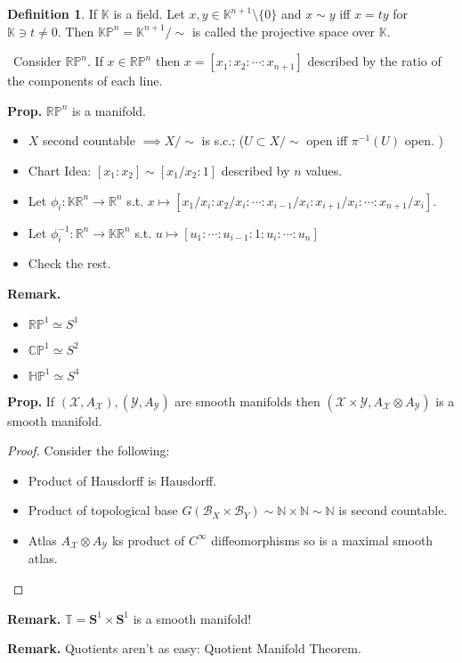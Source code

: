 \documentclass[11pt]{amsart}
\theoremstyle{definition}
\newtheorem{definition}{Definition}
\def\sphere{{\pmb S}}
\def\projspace{{ \mathbb{K}\mathbb{P} }}
\def\scriptb{{\mathcal B}}
\def\scriptx{{\mathcal X}}
\def\scripty{{\mathcal Y}}
\begin{document}
	\begin{definition}
		If $\mathbb{K}$ is a field. Let $x,y \in \mathbb{K}^{n+1} \setminus \{0\}$ and $x \sim y$ iff $x = ty$ for $\mathbb{K} \ni t \neq 0$. Then $\projspace^n = \mathbb{K}^{n+1}/\sim$ is called the projective space over $\mathbb{K}.$ 
	\end{definition}

	\ Consider $\mathbb{R}\mathbb{P}^n$. If $x \in \mathbb{R}\mathbb{P}^n$ then $x = [ x_1 : x_2 : \cdots : x_{n+1}]$ described by the ratio of the components of each line.

	\noindent \textbf{Prop.} $\mathbb{R}{\mathbb{P}}^n$ is a manifold.
	\begin{itemize}
		\item  $X$ second countable $\implies X /\sim$ is s.c.; ($U \subset X / \sim $ open iff $\pi^{-1}(U)$ open. )
		\item Chart Idea: $ [ x_1 : x_2 ] \sim  [ x_1/x_2 : 1]$ described by $n$ values.
		\item Let $\phi_i: \mathbb{K}\mathbb{R}^{n} \to \mathbb{R}^n$  s.t. $x \mapsto  [ x_1/x_i : x_2/x_i : \cdots : x_{i-1}/{x_i} : x_{i+1}/{x_i} : \cdots : x_{n+1}/x_i]$.
		\item Let $\phi_i^{-1}: \mathbb{R}^n \to \mathbb{K}\mathbb{R}^{n}$ s.t. $u \mapsto [u_1 : \cdots : u_{i-1} : 1 : u_i : \cdots : u_n] $
		\item Check the rest.
	\end{itemize}



	\noindent\textbf{Remark.}
	\begin{itemize}
		\item $\mathbb{R}\mathbb{P}^1 \simeq S^1$
		\item $\mathbb{C}\mathbb{P}^1 \simeq S^2$
		\item $\mathbb{H}\mathbb{P}^1 \simeq S^4$
	\end{itemize}


	\noindent \textbf{Prop.} If $(\scriptx, A_\scriptx),(\scripty, A_\scripty)$ are smooth manifolds then $(\scriptx \times \scripty, A_\scriptx \otimes A_\scripty)$ is a smooth manifold.
	\begin{proof}
	Consider the following:
		\begin{itemize}
			\item Product of Hausdorff is Hausdorff.
			\item Product of topological base $G(\scriptb_X \times \scriptb_Y) \sim  \mathbb{N} \times \mathbb{N} \sim \mathbb{N}$ is second countable.
			\item Atlas $A_\scriptx \otimes A_\scripty$ ks product of $C^{\infty}$ diffeomorphisms so is a maximal smooth atlas.
		\end{itemize}
	\end{proof}


	\noindent \textbf{Remark.} $\mathbb{T} = \sphere^1 \times \sphere^1$ is a smooth manifold!

	\noindent \textbf{Remark.} Quotients aren't as easy: Quotient Manifold Theorem.
\end{document}
